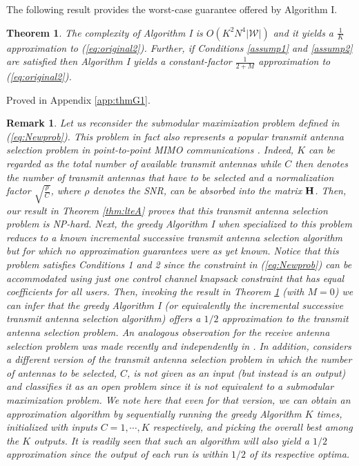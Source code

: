 \documentclass[11pt] {article}
\newcommand{\Wc} {{\mathcal W}}         \newcommand{\Wk} {{\bm {\mathcal W}}}
\newtheorem{remark}{Remark}
\newtheorem{theorem}{Theorem}
\begin{document}
The following result provides the worst-case guarantee offered by Algorithm I.
\begin{theorem}\label{thmG1}
 The complexity of  Algorithm I is $O(K^2N^4|\Wc|)$ and it yields a $\frac{1}{K}$ approximation to (\ref{eq:original2}). Further, if Conditions \ref{assump1} and \ref{assump2} are satisfied  then
Algorithm I yields a constant-factor $\frac{1}{2+M}$ approximation to (\ref{eq:original2}). \end{theorem}

\proof Proved in Appendix \ref{app:thmG1}.


\begin{remark}
Let us reconsider the submodular maximization problem defined in (\ref{eq:Newprob}). This problem in fact  also represents a popular transmit antenna selection problem in point-to-point MIMO communications \cite{sanayei:AS}. Indeed, $K$ can be regarded as the total number of available transmit antennas while $C$ then denotes the number of transmit antennas that have to be selected and a normalization  factor $\sqrt{\frac{\rho}{C}}$, where $\rho$ denotes the SNR, can be absorbed into the matrix ${{\mathbf H}}$. Then, our result in Theorem \ref{thm:lteA}  proves that this transmit antenna selection problem is NP-hard. Next,   the greedy Algorithm I when specialized to this problem reduces to a known incremental successive transmit antenna selection algorithm \cite{sanayei:AS} but for which no approximation guarantees were as yet known. Notice that this problem satisfies Conditions 1 and 2 since the constraint in (\ref{eq:Newprob}) can be accommodated using just one control channel knapsack constraint that has  equal coefficients for all users. Then, invoking the result in Theorem  \ref{thmG1} (with $M=0$) we can infer that the greedy Algorithm I (or equivalently the incremental successive transmit antenna selection algorithm) offers a $1/2$ approximation to the transmit antenna selection problem. An analogous observation for the receive antenna selection problem was made recently and independently in \cite{Txselectvaze}.  In addition, \cite{Txselectvaze}  considers a different version of the  transmit antenna selection problem   in which the number of antennas to be selected, $C$, is not given as an input (but instead is an output) and classifies it as an open problem since it is not equivalent to a submodular maximization problem. We note here that  even for that version, we can obtain an approximation algorithm by sequentially running the greedy Algorithm $K$ times, initialized with inputs $C=1,\cdots,K$ respectively, and picking the overall best among the $K$ outputs. It is readily seen that such an algorithm will also yield a $1/2$ approximation since the output of each run is within $1/2$ of its respective optima.
\end{remark}
\end{document}
